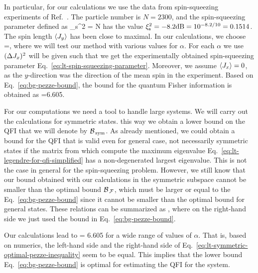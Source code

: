 In particular, for our calculations we use the data from spin-squeezing experiments of Ref.~\cite{Gross2010}.
The particle number is $N=2300$, and the spin-squeezing parameter defined as
\be
  \label{eq:lt-spin-squeezing-parameter}
  \xi_{\textnormal{s}}^2 = N 
\ee
has the value $\xi_{\textnormal{s}}^2=-8.2\textnormal{dB}=10^{-8.2/10}=0.1514$.
The spin length $\langle{J_y}\rangle$ has been close to maximal.
In our calculations, we choose
\be
  =\alpha {},
\ee
where we will test our method with various values for $\alpha$.
For each $\alpha$ we use $(\Delta J_x )^2$ will be given such that we get the experimentally obtained spin-squeezing parameter Eq.~\eqref{eq:lt-spin-squeezing-parameter}.
Moreover, we assume $\langle{J_x}\rangle=0$, as the $y$-direction was the direction of the mean spin in the experiment.
Based on Eq.~\eqref{eq:bg-pezze-bound}, the bound for the quantum Fisher information is obtained as
\be
  \label{eq:lt-bound-for-experiment}
  \geqslant {}=6.605.
\ee

For our computations we need a tool to handle large systems.
We will carry out the calculations for symmetric states.
this way we obtain a lower bound on the QFI that we will denote by $\mathcal{B}_{\, \textnormal{sym} }$.
As already mentioned, we could obtain a bound for the QFI that is valid even for general case, not necessarily symmetric states if the matrix from which compute the maximum eigenvalue Eq.~\eqref{eq:lt-legendre-for-qfi-simplified} has a non-degenerated largest eigenvalue.
This is not the case in general for the spin-squeezing problem.
However, we still know that our bound obtained with our calculations in the symmetric subspace cannot be smaller than the optimal bound $\mathcal{B}_{\, \mathcal{F} }$, which must be larger or equal to the Eq.~\eqref{eq:bg-pezze-bound} since it cannot be smaller than the optimal bound for general states.
These relations can be summarized as
\be
  \geqslant {}\geqslant{},
\ee
where on the right-hand side we just used the bound in Eq.~\eqref{eq:bg-pezze-bound}.

Our calculations lead to
\be
  \label{eq:lt-symmetric-optimal-pezze-inequality}
   = 6.605
\ee
for a wide range of values of $\alpha$.
That is, based on numerics, the left-hand side and the right-hand side of Eq.~\eqref{eq:lt-symmetric-optimal-pezze-inequality} seem to be equal.
This implies that the lower bound Eq.~\eqref{eq:bg-pezze-bound} is optimal for estimating the QFI for the system.

